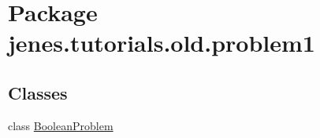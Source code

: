 \hypertarget{namespacejenes_1_1tutorials_1_1old_1_1problem1}{\section{Package jenes.\-tutorials.\-old.\-problem1}
\label{namespacejenes_1_1tutorials_1_1old_1_1problem1}
}
\subsection*{Classes}
\begin{DoxyCompactItemize}
\item 
class \hyperlink{classjenes_1_1tutorials_1_1old_1_1problem1_1_1_boolean_problem}{Boolean\-Problem}
\end{DoxyCompactItemize}
